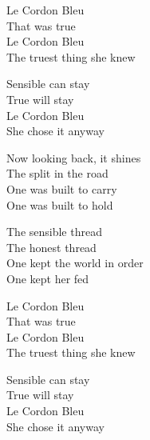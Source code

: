 \begin{lyrics}
Le Cordon Bleu\\
That was true\\
Le Cordon Bleu\\
The truest thing she knew

Sensible can stay\\
True will stay\\
Le Cordon Bleu\\
She chose it anyway

Now looking back, it shines\\
The split in the road\\
One was built to carry\\
One was built to hold

The sensible thread\\
The honest thread\\
One kept the world in order\\
One kept her fed

Le Cordon Bleu\\
That was true\\
Le Cordon Bleu\\
The truest thing she knew

Sensible can stay\\
True will stay\\
Le Cordon Bleu\\
She chose it anyway
\end{lyrics}

